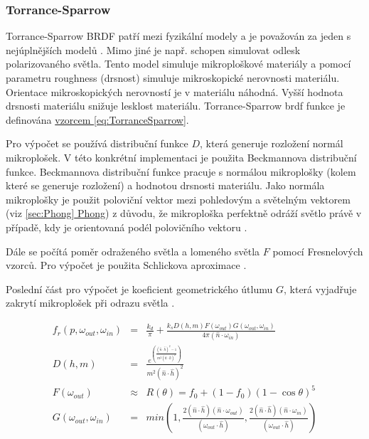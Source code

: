 \documentclass[czech,master,dept460,male,cpp,cpdeclaration]{diploma}
\newcommand{\uvec}[1]{\hat{#1}}
\begin{document}
\subsubsection{Torrance-Sparrow} \label{sec:torrancesparrow}
Torrance-Sparrow BRDF patří mezi fyzikální modely a je považován za jeden s nejúplnějších modelů \cite{BRDFOverview}. Mimo jiné je např. schopen simulovat odlesk polarizovaného světla. Tento model simuluje mikroploškové materiály a pomocí parametru roughness (drsnost) simuluje mikroskopické nerovnosti materiálu. Orientace mikroskopických nerovností je v materiálu náhodná. Vyšší hodnota drsnosti materiálu snižuje lesklost materiálu. Torrance-Sparrow brdf funkce je definována \hyperref[eq:TorranceSparrow]{vzorcem \ref{eq:TorranceSparrow}}. \par
Pro výpočet se používá distribuční funkce \(D\), která generuje rozložení normál mikroplošek. V této konkrétní implementaci je použita Beckmannova distribuční funkce. Beckmannova distribuční funkce pracuje s normálou mikroplošky (kolem které se generuje rozložení) a hodnotou drsnosti materiálu. Jako normála mikroplošky je použit poloviční vektor mezi pohledovým a světelným vektorem (viz \hyperref[sec:Phong]{\ref{sec:Phong} Phong}) z důvodu, že mikroploška perfektně odráží světlo právě v případě, kdy je orientovaná podél polovičního vektoru \cite{PHARR2017507}. \par
Dále se počítá poměr odraženého světla a lomeného světla \(F\) pomocí Fresnelových vzorců. Pro výpočet je použita Schlickova aproximace \cite{SchlickFresnel}. \par
Poslední část pro výpočet je koeficient geometrického útlumu \(G\), která vyjadřuje zakrytí mikroplošek při odrazu světla \cite{BRDFOverview}.


\begin{eqnarray}
    f_r\left(p,\omega_{out},\omega_{in}\right) & = & \frac{k_d}{\pi} + \frac{k_sD(h,m)F(\omega_{out})G(\omega_{out},\omega_{in})}{4\pi (\uvec{n}\cdot \omega_{in})}\label{eq:TorranceSparrow}\\
    D(h,m) & = & \frac{e^{\left(\frac{(\uvec{n}\cdot \uvec{h})^2-1}{m^2(\uvec{n}\cdot \uvec{h})^2}\right)}}{m^2(\uvec{n}\cdot \uvec{h})^2}\\
    F(\omega_{out}) & \approx & R(\theta) = f_0 + (1-f_0)(1-\cos\theta)^5\\
    G(\omega_{out},\omega_{in}) & = & min \left( 1, \frac{2 ( \uvec{n} \cdot \uvec{h} ) ( \uvec{n} \cdot \omega_{out} )
        }{ ( \omega_{out} \cdot \uvec{h} ) },\frac{ 2 ( \uvec{n} \cdot \uvec{h} ) ( \uvec{n} \cdot \omega_{in} ) }{ ( \omega_{out} \cdot \uvec{h} ) } \right)
\end{eqnarray}
\end{document}
